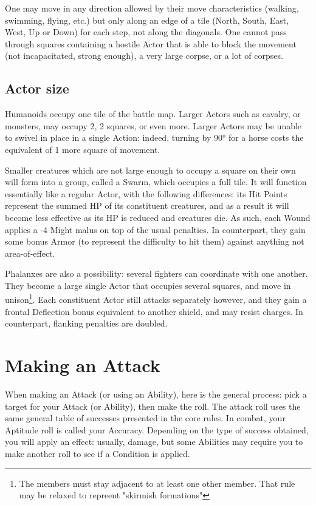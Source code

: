 One may move in any direction allowed by their move characteristics (walking, swimming, flying, etc.) but only along an edge of a tile (North, South, East, West, Up or Down) for each step, not along the diagonals. One cannot pass through squares containing a hostile Actor that is able to block the movement (not incapacitated, strong enough), a very large corpse, or a lot of corpses. 


\subsection{Actor size}

\label{actor_size}

Humanoids occupy one tile of the battle map. Larger Actors such as cavalry, or monsters, may occupy 2, 2 squares, or even more. Larger Actors may be unable to swivel in place in a single Action: indeed, turning by 90° for a horse costs the equivalent of 1 more square of movement.

Smaller creatures which are not large enough to occupy a square on their own will form into a group, called a Swarm, which occupies a full tile. It will function essentially like a regular Actor, with the following differences: its Hit Points represent the summed HP of its constituent creatures, and as a result it will become less effective as its HP is reduced and creatures die. As such, each Wound applies a -4 Might malus on top of the usual penalties. In counterpart, they gain some bonus Armor (to represent the difficulty to hit them) against anything not area-of-effect.

Phalanxes are also a possibility: several fighters can coordinate with one another. They become a large single Actor that occupies several squares, and move in unison\footnote{The members must stay adjacent to at least one other member. That rule may be relaxed to repreent "skirmish formations"}. Each constituent Actor still attacks separately however, and they gain a frontal Deflection bonus equivalent to another shield, and may resist charges. In counterpart, flanking penalties are doubled. 


\section{Making an Attack}


When making an Attack (or using an Ability), here is the general process: pick a target for your Attack (or Ability), then make the roll. The attack roll uses the same general table of successes presented in the core rules. In combat, your Aptitude roll is called your Accuracy. Depending on the type of success obtained, you will apply an effect: usually, damage, but some Abilities may require you to make another roll to see if a Condition is applied.


